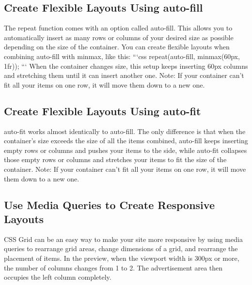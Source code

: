 \documentclass{article}%
\begin{document}
%
\subsection{Create Flexible Layouts Using auto{-}fill}%
\label{subsec:CreateFlexibleLayoutsUsingauto{-}fill}%
The repeat function comes with an option called auto{-}fill. This allows you to automatically insert as many rows or columns of your desired size as possible depending on the size of the container. You can create flexible layouts when combining auto{-}fill with minmax, like this:\newline%
```css\newline%
repeat(auto{-}fill, minmax(60px, 1fr));\newline%
```\newline%
When the container changes size, this setup keeps inserting 60px columns and stretching them until it can insert another one.\newline%
Note: If your container can't fit all your items on one row, it will move them down to a new one.\newline%

%
\subsection{Create Flexible Layouts Using auto{-}fit}%
\label{subsec:CreateFlexibleLayoutsUsingauto{-}fit}%
auto{-}fit works almost identically to auto{-}fill. The only difference is that when the container's size exceeds the size of all the items combined, auto{-}fill keeps inserting empty rows or columns and pushes your items to the side, while auto{-}fit collapses those empty rows or columns and stretches your items to fit the size of the container.\newline%
Note: If your container can't fit all your items on one row, it will move them down to a new one.\newline%

%
\subsection{Use Media Queries to Create Responsive Layouts}%
\label{subsec:UseMediaQueriestoCreateResponsiveLayouts}%
CSS Grid can be an easy way to make your site more responsive by using media queries to rearrange grid areas, change dimensions of a grid, and rearrange the placement of items.\newline%
In the preview, when the viewport width is 300px or more, the number of columns changes from 1 to 2. The advertisement area then occupies the left column completely.\newline%
\end{document}
